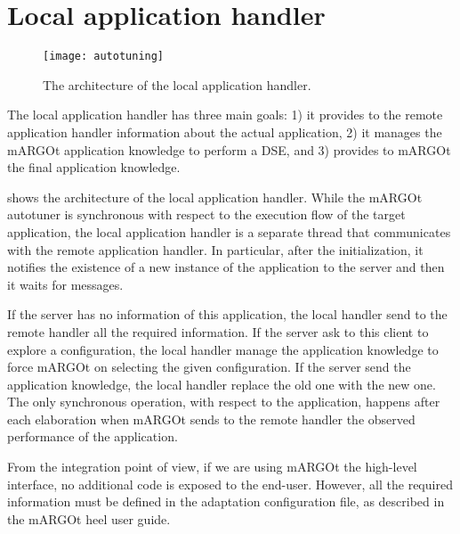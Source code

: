 \section{Local application handler}

\begin{figure}
	\centering
	\texttt{[image: autotuning]}
	\caption{The architecture of the local application handler.}
	\label{fig:autotuner}
\end{figure}

The local application handler has three main goals: 1) it provides to the remote application handler information about the actual application, 2) it manages the mARGOt application knowledge to perform a DSE, and 3) provides to mARGOt the final application knowledge.

 shows the architecture of the local application handler.
While the mARGOt autotuner is synchronous with respect to the execution flow of the target application, the local application handler is a separate thread that communicates with the remote application handler.
In particular, after the initialization, it notifies the existence of a new instance of the application to the server and then it waits for messages.

If the server has no information of this application, the local handler send to the remote handler all the required information.
If the server ask to this client to explore a configuration, the local handler manage the application knowledge to force mARGOt on selecting the given configuration.
If the server send the application knowledge, the local handler replace the old one with the new one.
The only synchronous operation, with respect to the application, happens after each elaboration when mARGOt sends to the remote handler the observed performance of the application.


From the integration point of view, if we are using mARGOt the high-level interface, no additional code is exposed to the end-user.
However, all the required information must be defined in the adaptation configuration file, as described in the mARGOt heel user guide.
